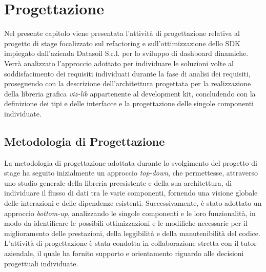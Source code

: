 \chapter{Progettazione}
\label{chap:progettazione}
Nel presente capitolo viene presentata l'attività di progettazione relativa al progetto di stage focalizzato sul refactoring e
sull'ottimizzazione dello SDK impiegato dall'azienda Datasoil S.r.l. per lo sviluppo di dashboard dinamiche.
Verrà analizzato l'approccio adottato per individuare le soluzioni volte al soddisfacimento dei requisiti individuati durante
la fase di analisi dei requisiti, proseguendo con la descrizione dell'architettura progettata per la realizzazione della libreria grafica \textit{viz-lib}
appartenente al development kit, concludendo con la definizione dei tipi e delle interfacce e la progettazione delle singole componenti individuate.

\section{Metodologia di Progettazione}
La metodologia di progettazione adottata durante lo svolgimento del progetto di stage ha seguito inizialmente un approccio
\textit{top-down}, che permettesse, attraverso uno studio generale della libreria preesistente e della sua architettura, di individuare
il flusso di dati tra le varie componenti, fornendo una visione globale delle interazioni e delle dipendenze esistenti.
Successivamente, è stato adottato un approccio \textit{bottom-up}, analizzando le singole componenti e le loro funzionalità,
in modo da identificare le possibili ottimizzazioni e le modifiche necessarie per il miglioramento delle prestazioni, della leggibilità e
della manutenibilità del codice.\newline
L'attività di progettazione è stata condotta in collaborazione stretta con il tutor aziendale, il quale ha fornito supporto e orientamento
riguardo alle decisioni progettuali individuate.

